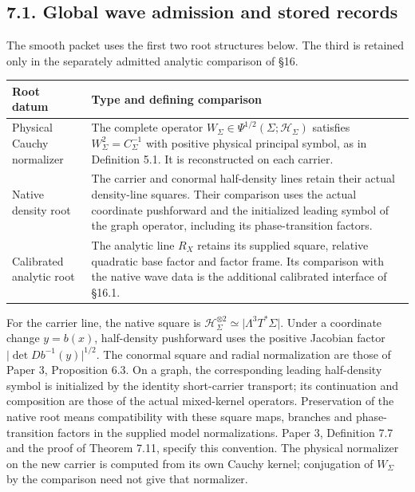 \documentclass[
  english,
  11pt,
  reqno]{amsart}
\newcounter{none} %
\begin{document}
\protect{}\label{sec:global-wave-admission-records}

\subsection{7.1. Global wave admission and stored
records}\label{global-wave-admission-and-stored-records}

The smooth packet uses the first two root structures below. The third is
retained only in the separately admitted analytic comparison of §16.

{\def\LTcaptype{none} %
\begin{longtable}[]{@{}
  >{\raggedright\arraybackslash}p{}
  >{\raggedright\arraybackslash}p{}@{}}
\toprule\noalign{}
\begin{minipage}[b]{\linewidth}\raggedright
Root datum
\end{minipage} & \begin{minipage}[b]{\linewidth}\raggedright
Type and defining comparison
\end{minipage} \\
\midrule\noalign{}
\endhead
\bottomrule\noalign{}
\endlastfoot
Physical Cauchy normalizer & The complete operator
\(W_\Sigma\in\Psi^{1/2}(\Sigma;\mathcal H_\Sigma)\) satisfies
\(W_\Sigma^2=C_\Sigma^{-1}\) with positive physical principal symbol, as
in Definition 5.1. It is reconstructed on each carrier. \\
Native density root & The carrier and conormal half-density lines retain
their actual density-line squares. Their comparison uses the actual
coordinate pushforward and the initialized leading symbol of the graph
operator, including its phase-transition factors. \\
Calibrated analytic root & The analytic line \(R_X\) retains its
supplied square, relative quadratic base factor and factor frame. Its
comparison with the native wave data is the additional calibrated
interface of §16.1. \\
\end{longtable}
}

For the carrier line, the native square is
\(\mathcal H_\Sigma^{\otimes2}\simeq\lvert\Lambda^3T^*\Sigma\rvert\).
Under a coordinate change \(y=b(x)\), half-density pushforward uses the
positive Jacobian factor \(\lvert\det D b^{-1}(y)\rvert^{1/2}\). The
conormal square and radial normalization are those of Paper 3,
Proposition 6.3. On a graph, the corresponding leading half-density
symbol is initialized by the identity short-carrier transport; its
continuation and composition are those of the actual mixed-kernel
operators. Preservation of the native root means compatibility with
these square maps, branches and phase-transition factors in the supplied
model normalizations. Paper 3, Definition 7.7 and the proof of Theorem
7.11, specify this convention. The physical normalizer on the new
carrier is computed from its own Cauchy kernel; conjugation of
\(W_\Sigma\) by the comparison need not give that normalizer.
\end{document}
